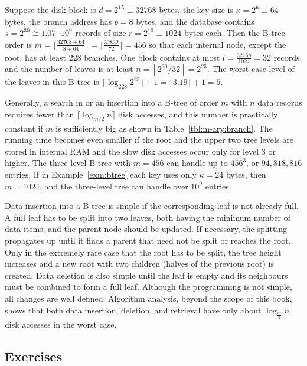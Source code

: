 \begin{Example}\label{exm:btree}
Suppose the disk block is $d=2^{15}\equiv 32768$ bytes, 
the key size is $\kappa=2^{6}\equiv 64$ bytes, the branch 
address has \(b=8\) bytes, and the
database contains $s=2^{30}\cong 1.07\cdot 10^9$ records
of size $r=2^{10}\equiv 1024$ bytes each. Then
the B-tree order is 
$m=\lfloor \frac{32768+64}{8+64} \rfloor =
\lfloor \frac{32832}{72} \rfloor = 456$ so that each internal node, 
except the root, has at least 228 branches.
One block contains at most $l=\frac{32768}{1024}=32$ records,
and the number of leaves is at least 
$n = \left\lceil 2^{30}/32 \right\rceil = 2^{25}$. The
worst-case level of the leaves in this B-tree is 
$\lceil \log_{228} 2^{25}\rceil +1 = \lceil 3.19 \rceil +1 = 5$.
\end{Example}

Generally, a search in or an insertion into a B-tree of order $m$ with $n$
data records requires fewer than $\lceil \log_{m/2}n \rceil$ disk
accesses, and this number is practically constant if $m$ is sufficiently
big as shown in Table~\ref{tbl:m-ary:branch}. The running time becomes
even smaller if the root and the upper two tree levels are stored in
internal RAM and the slow disk accesses occur only for level 3 or
higher. The three-level B-tree with $m=456$ can handle up to $456^{3}$,
or $94,818,816$ entries. If in Example~\ref{exm:btree} each key uses
only \(\kappa=24\) bytes, then $m = 1024$, and the three-level tree can
handle over $10^9$ entries.

Data insertion into a B-tree is simple if the corresponding leaf is not
already full. A full leaf has to be split into two leaves, both having
the minimum number of data items, and the parent node should be updated.
If necessary, the splitting propagates up until it finds a parent that
need not be split or reaches the root. Only in the extremely rare case
that the root has to be split, the tree height increases and a new root
with two children (halves of the previous root) is created. Data
deletion is also simple until the leaf is empty and its neighbours must
be combined to form a full leaf. Although the programming is not simple, all
changes are well defined. Algorithm analysis, beyond the scope of this
book, shows that both data insertion,
deletion, and retrieval have only about $\log_{\frac{m}{2}} n$ disk
accesses in the worst case.

\subsection*{Exercises}

